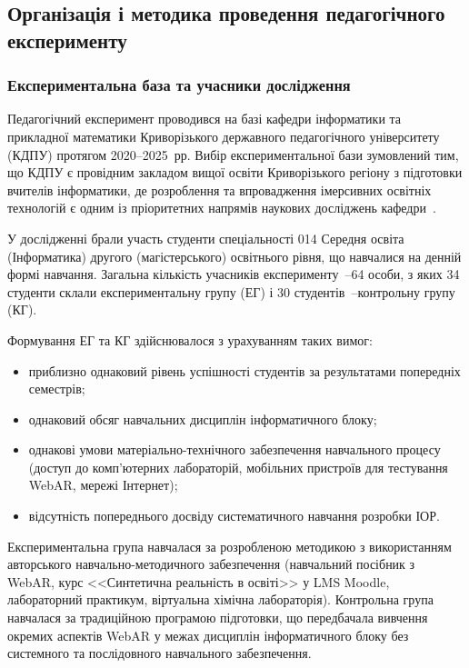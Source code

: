 \subsection{Організація і методика проведення педагогічного експерименту}\label{sec:3.2}

\subsubsection{Експериментальна база та учасники дослідження}

Педагогічний експеримент проводився на базі кафедри інформатики та прикладної математики Криворізького державного педагогічного університету (КДПУ) протягом 2020--2025~рр. Вибір експериментальної бази зумовлений тим, що КДПУ є провідним закладом вищої освіти Криворізького регіону з підготовки вчителів інформатики, де розроблення та впровадження імерсивних освітніх технологій є одним із пріоритетних напрямів наукових досліджень кафедри~\cite{Semerikov2022IERDesign}.

У дослідженні брали участь студенти спеціальності 014 Середня освіта (Інформатика) другого (магістерського) освітнього рівня, що навчалися на денній формі навчання. Загальна кількість учасників експерименту~--64 особи, з яких 34 студенти склали експериментальну групу (ЕГ) і 30 студентів~--контрольну групу (КГ).

Формування ЕГ та КГ здійснювалося з урахуванням таких вимог:
\begin{itemize}
\item приблизно однаковий рівень успішності студентів за результатами попередніх семестрів;
\item однаковий обсяг навчальних дисциплін інформатичного блоку;
\item однакові умови матеріально-технічного забезпечення навчального процесу (доступ до комп'ютерних лабораторій, мобільних пристроїв для тестування WebAR, мережі Інтернет);
\item відсутність попереднього досвіду систематичного навчання розробки ІОР.
\end{itemize}

Експериментальна група навчалася за розробленою методикою з використанням авторського навчально-методичного забезпечення (навчальний посібник з WebAR, курс <<Синтетична реальність в освіті>> у LMS Moodle, лабораторний практикум, віртуальна хімічна лабораторія). Контрольна група навчалася за традиційною програмою підготовки, що передбачала вивчення окремих аспектів WebAR у межах дисциплін інформатичного блоку без системного та послідовного навчального забезпечення.

